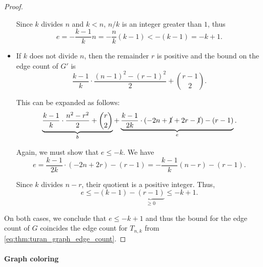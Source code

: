 \begin{proof}
\begin{itemize}
    Since \( k \) divides \( n \) and \( k < n \), \( n / k \) is an integer greater than \( 1 \), thus
    \begin{equation*}
      e = - \frac {k - 1} k n = - \frac n k (k - 1) < -(k - 1) = -k + 1.
    \end{equation*}

    \item If \( k \) does not divide \( n \), then the remainder \( r \) is positive and the bound on the edge count of \( G' \) is
    \begin{equation*}
      \frac {k - 1} k \cdot \frac {(n - 1)^2 - (r - 1)^2} 2 + \binom {r - 1} 2.
    \end{equation*}

    This can be expanded as follows:
    \begin{equation*}
      \underbrace{\frac {k - 1} k \cdot \frac {n^2 - r^2} 2 + \binom r 2}_b + \underbrace{\frac {k - 1} {2k} \cdot (-2n + \cancel{1} + 2r - \cancel{1}) - (r - 1)}_e.
    \end{equation*}

    Again, we must show that \( e \leq -k \). We have
    \begin{equation*}
      e = \frac {k - 1} {2k} \cdot (-2n + 2r) - (r - 1) = -\frac {k - 1} k (n - r) - (r - 1).
    \end{equation*}

    Since \( k \) divides \( n - r \), their quotient is a positive integer. Thus,
    \begin{equation*}
      e \leq -(k - 1) - \underbrace{(r - 1)}_{\geq 0} \leq -k + 1.
    \end{equation*}
  \end{itemize}

  On both cases, we conclude that \( e \leq -k + 1 \) and thus the bound for the edge count of \( G \) coincides the edge count for \( T_{n,k} \) from \eqref{eq:thm:turan_graph_edge_count}.
\end{proof}

\paragraph{Graph coloring}

